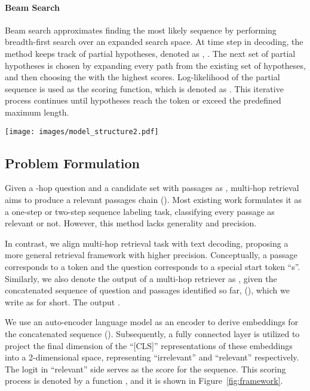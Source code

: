 \documentclass[10.5pt]{article}
\begin{document}
\paragraph{Beam Search}\label{beam_search}
Beam search approximates finding the most likely sequence by performing breadth-first search over an expanded search space. At time step  in decoding, the method keeps track of  partial hypotheses, denoted as , . The next set of partial hypotheses is chosen by expanding every path from the existing set of  hypotheses, and then choosing the  with the highest scores. Log-likelihood of the partial sequence is used as the scoring function, which is denoted as . This iterative process continues until hypotheses reach the  token or exceed the predefined maximum length.
\begin{figure*}[!ht]
  \centering
  \texttt{[image: images/model\_structure2.pdf]}
  \caption{A visualization of Beam Retrieval with a beam size of 2 for the example in Figure~\ref{fig:examples}. The left part shows how to obtain scores for each hypothesis, where M denotes the number of hypotheses at each hop, L denotes the max length of the hypotheses and h denotes the output dimension of the encoder. The right part shows how Beam Retrieval reasons and trains in an end-to-end way, where the red path refers to the ground-truth relevant passages.}
  \label{fig:framework}
\end{figure*}
\subsection{Problem Formulation}\label{score_function}
Given a -hop question  and a candidate set with  passages as , multi-hop retrieval aims to produce a relevant passages chain (). Most existing work formulates it as a one-step or two-step sequence labeling task, classifying every passage  as relevant or not. However, this method lacks generality and precision.

In contrast, we align multi-hop retrieval task with text decoding, proposing a more general retrieval framework with higher precision. Conceptually, a passage  corresponds to a token  and the question  corresponds to a special start token ``s''. Similarly, we also denote the output of a multi-hop retriever as , given the concatenated sequence of question and passages identified so far, (), which we write as  for short. The output . 

We use an auto-encoder language model as an encoder to derive embeddings for the concatenated sequence (). Subsequently, a fully connected layer is utilized to project the final dimension of the ``[CLS]'' representations of these embeddings into a 2-dimensional space, representing ``irrelevant'' and ``relevant'' respectively. The logit in ``relevant'' side serves as the score for the sequence. This scoring process is denoted by a function , and it is shown in Figure~\ref{fig:framework}.
\end{document}
